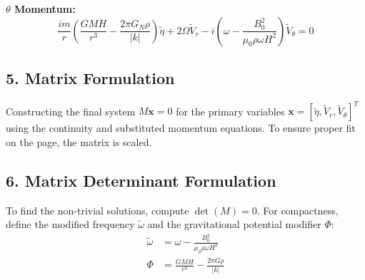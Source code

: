 \documentclass[11pt]{article}
\begin{document}
\textbf{$\theta$ Momentum:}
\begin{equation}
\frac{im}{r} \left( \frac{GM H}{r^3} - \frac{2\pi G_N \rho}{|k|} \right) \tilde{\eta} + 2\Omega\tilde{V}_r - i \left( \omega - \frac{B_0^2}{\mu_0 \rho \omega H^2} \right) \tilde{V}_\theta = 0
\end{equation}

\subsection*{5. Matrix Formulation}
Constructing the final system $M \mathbf{x} = 0$ for the primary variables $\mathbf{x} = [\tilde{\eta}, \tilde{V}_r, \tilde{V}_\theta]^T$ using the continuity and substituted momentum equations. To ensure proper fit on the page, the matrix is scaled.

\vspace{0.5cm}
\noindent
{}


\subsection*{6. Matrix Determinant Formulation}
To find the non-trivial solutions, compute $\det(M) = 0$. For compactness, define the modified frequency $\tilde{\omega}$ and the gravitational potential modifier $\Phi$:
\begin{align}
\tilde{\omega} &= \omega - \frac{B_0^2}{\mu_0 \rho \omega H^2} \\
\Phi &= \frac{GM H}{r^3} - \frac{2\pi G \rho}{|k|}
\end{align}
\end{document}

